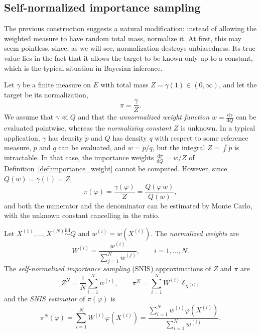 \subsection{Self-normalized importance sampling}
\label{sec:self_normalized_importance_sampling}
The previous construction suggests a natural modification: instead of allowing the weighted measure to have random total mass, normalize it. At first, this may seem pointless, since, as we will see, normalization destroys unbiasedness. Its true value lies in the fact that it allows the target to be known only up to a constant, which is the typical situation in Bayesian inference.

Let $\gamma$ be a finite measure on $E$ with total mass $Z = \gamma(1)\in(0,\infty)$, and let the target be its normalization,
\begin{equation}
    \pi = \frac{\gamma}{Z}.
\end{equation}
We assume that $\gamma\ll Q$ and that the \emph{unnormalized weight function} $w = \frac{\mathrm{d}\gamma}{\mathrm{d}Q}$ can be evaluated pointwise, whereas the \emph{normalizing constant} $Z$ is unknown. In a typical application, $\gamma$ has density $\tilde{p}$ and $Q$ has density $q$ with respect to some reference measure, $\tilde{p}$ and $q$ can be evaluated, and $w = \tilde{p}/q$, but the integral $Z = \int\tilde{p}$ is intractable. In that case, the importance weights $\frac{\mathrm{d}\pi}{\mathrm{d}Q} = w/Z$ of Definition~\ref{def:importance_weight} cannot be computed. However, since $Q(w) = \gamma(1) = Z$,
\begin{equation}
    \pi(\varphi) = \frac{\gamma(\varphi)}{Z} = \frac{Q(\varphi\,w)}{Q(w)},
\end{equation}
and both the numerator and the denominator can be estimated by Monte Carlo, with the unknown constant cancelling in the ratio.

\begin{definition}
    \label{def:snis}
    Let $X^{(1)},\ldots,X^{(N)}\overset{\mathrm{iid}}{\sim}Q$ and $w^{(i)} = w(X^{(i)})$. The \emph{normalized weights} are
    \begin{equation}
        W^{(i)} = \frac{w^{(i)}}{\sum_{j=1}^{N}w^{(j)}}, \qquad i=1,\ldots,N.
    \end{equation}
    The \emph{self-normalized importance sampling} (SNIS) approximations of $Z$ and $\pi$ are
    \begin{equation}
        Z^N = \frac{1}{N}\sum_{i=1}^{N}w^{(i)}, \qquad
        \pi^N = \sum_{i=1}^{N}W^{(i)}\,\delta_{X^{(i)}},
        \label{eq:snis_measure}
    \end{equation}
    and the \emph{SNIS estimator} of $\pi(\varphi)$ is
    \begin{equation}
        \pi^N(\varphi) = \sum_{i=1}^{N}W^{(i)}\varphi(X^{(i)}) = \frac{\sum_{i=1}^{N}w^{(i)}\varphi(X^{(i)})}{\sum_{i=1}^{N}w^{(i)}}.
        \label{eq:snis_estimator}
    \end{equation}
\end{definition}


